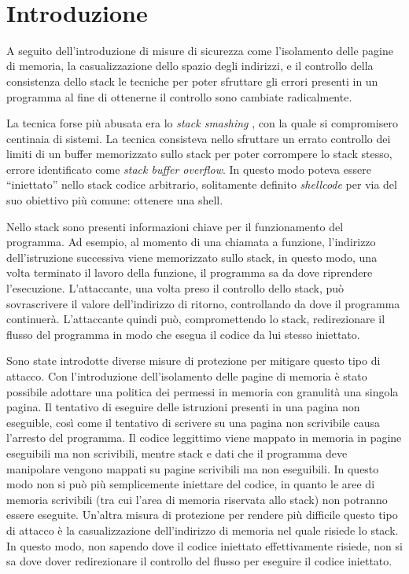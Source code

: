 \thispagestyle{empty}
\
\newpage
\clearpage{\pagestyle{empty}\cleardoublepage}
\mainmatter
\chapter{Introduzione}


A seguito dell'introduzione di misure di sicurezza come l'isolamento
delle pagine di memoria, la casualizzazione dello spazio degli
indirizzi, e il controllo della consistenza dello stack le tecniche
per poter sfruttare gli errori presenti in un programma al fine di
ottenerne il controllo sono cambiate radicalmente.

La tecnica forse più abusata era lo \emph{stack smashing}
\cite{Phrack-96}, con la quale si compromisero centinaia di
sistemi. La tecnica consisteva nello sfruttare un errato controllo dei
limiti di un buffer memorizzato sullo stack per poter corrompere lo
stack stesso, errore identificato come \emph{stack buffer
  overflow}. In questo modo poteva essere ``iniettato'' nello stack
codice arbitrario, solitamente definito \emph{shellcode} per via del
suo obiettivo più comune: ottenere una shell. 

Nello stack sono presenti informazioni chiave per il funzionamento del
programma. Ad esempio, al momento di una chiamata a funzione,
l'indirizzo dell'istruzione successiva viene memorizzato sullo stack,
in questo modo, una volta terminato il lavoro della funzione, il
programma sa da dove riprendere l'esecuzione. L'attaccante, una volta
preso il controllo dello stack, può sovrascrivere il valore
dell'indirizzo di ritorno, controllando da dove il programma
continuerà. L'attaccante quindi può, compromettendo lo stack,
redirezionare il flusso del programma in modo che esegua il codice da
lui stesso iniettato.

Sono state introdotte diverse misure di protezione per mitigare questo
tipo di attacco. Con l'introduzione dell'isolamento delle pagine di
memoria è stato possibile adottare una politica dei permessi in
memoria con granulità una singola pagina. Il tentativo di eseguire
delle istruzioni presenti in una pagina non eseguible, così come il
tentativo di scrivere su una pagina non scrivibile causa l'arresto del
programma. Il codice leggittimo viene mappato in memoria in pagine
eseguibili ma non scrivibili, mentre stack e dati che il programma
deve manipolare vengono mappati su pagine scrivibili ma non
eseguibili. In questo modo non si può più semplicemente iniettare del
codice, in quanto le aree di memoria scrivibili (tra cui l'area di
memoria riservata allo stack) non potranno essere eseguite. Un'altra
misura di protezione per rendere più difficile questo tipo di attacco
è la casualizzazione dell'indirizzo di memoria nel quale risiede lo
stack. In questo modo, non sapendo dove il codice iniettato
effettivamente risiede, non si sa dove dover redirezionare il
controllo del flusso per eseguire il codice iniettato.

